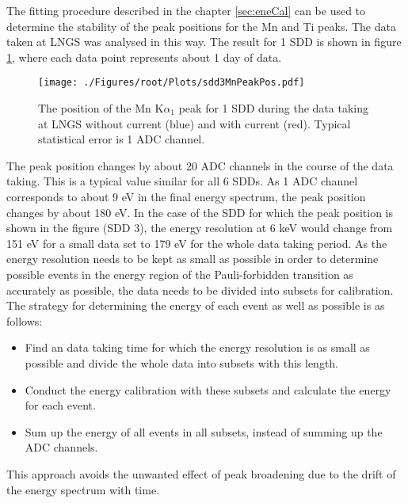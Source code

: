 The fitting procedure described in the chapter \ref{sec:eneCal} can be used to determine the stability of the peak positions for the Mn and Ti peaks. The data taken at LNGS was analysed in this way. The result for 1 SDD is shown in figure \ref{fig:sdd3PeakPos}, where each data point represents about 1 day of data. 
\begin{figure}[h]
 \centering
 \texttt{[image: ./Figures/root/Plots/sdd3MnPeakPos.pdf]}
 \caption{The position of the Mn K$\alpha_{1}$ peak for 1 SDD during the data taking at LNGS without current (blue) and with current (red). Typical statistical error is 1 ADC channel.}
 \label{fig:sdd3PeakPos}
\end{figure}
The peak position changes by about 20 ADC channels in the course of the data taking. This is a typical value similar for all 6 SDDs. As 1 ADC channel corresponds to about 9 eV in the final energy spectrum, the peak position changes by about 180 eV. In the case of the SDD for which the peak position is shown in the figure (SDD 3), the energy resolution at 6 keV would change from 151 eV for a small data set to 179 eV for the whole data taking period. As the energy resolution needs to be kept as small as possible in order to determine possible events in the energy region of the Pauli-forbidden transition as accurately as possible, the data needs to be divided into subsets for calibration. The strategy for determining the energy of each event as well as possible is as follows: 
\begin{itemize}
 \item Find an data taking time for which the energy resolution is as small as possible and divide the whole data into subsets with this length.
 \item Conduct the energy calibration with these subsets and calculate the energy for each event.
 \item Sum up the energy of all events in all subsets, instead of summing up the ADC channels.
\end{itemize}
This approach avoids the unwanted effect of peak broadening due to the drift of the energy spectrum with time.

